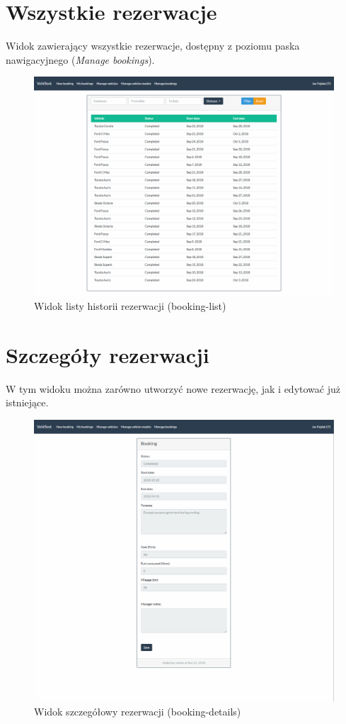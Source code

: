 \documentclass[eng,printmode,openany]{mgr}
\begin{document}
\begin{appendices}
		\section{Wszystkie rezerwacje}
		Widok zawierający wszystkie rezerwacje, dostępny z poziomu paska nawigacyjnego (\textit{Manage bookings}).
		\begin{figure}[H]
			\centering
			\includegraphics[width=\textwidth]{images/views/booking-list-manage.png}
			\caption{Widok listy historii rezerwacji (booking-list)}
		\end{figure}
		
		\newpage
		\section{Szczegóły rezerwacji}
		W tym widoku można zarówno utworzyć nowe rezerwację, jak i edytować już istniejące.
		\begin{figure}[H]
			\centering
			\includegraphics[width=\textwidth]{images/views/booking-detail.png}
			\caption{Widok szczegółowy rezerwacji (booking-details)}
		\end{figure}
				

\end{appendices}
\end{document}
